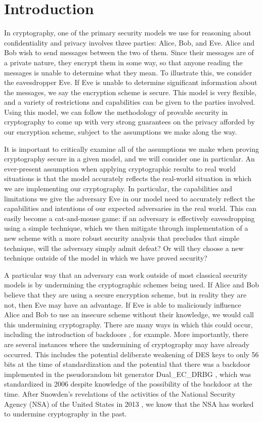 \chapter{Introduction}

In cryptography, one of the primary security models we use for reasoning about confidentiality and privacy involves three parties: Alice, Bob, and Eve. Alice and Bob wish to send messages between the two of them. Since their messages are of a private nature, they encrypt them in some way, so that anyone reading the messages is unable to determine what they mean. To illustrate this, we consider the eavesdropper Eve. If Eve is unable to determine significant information about the messages, we say the encryption scheme is secure. This model is very flexible, and a variety of restrictions and capabilities can be given to the parties involved. Using this model, we can follow the methodology of provable security in cryptography to come up with very strong guarantees on the privacy afforded by our encryption scheme, subject to the assumptions we make along the way.

It is important to critically examine all of the assumptions we make when proving cryptography secure in a given model, and we will consider one in particular. An ever-present assumption when applying cryptographic results to real world situations is that the model accurately reflects the real-world situation in which we are implementing our cryptography. In particular, the capabilities and limitations we give the adversary Eve in our model need to accurately reflect the capabilities and intentions of our expected adversaries in the real world. This can easily become a cat-and-mouse game: if an adversary is effectively eavesdropping using a simple technique, which we then mitigate through implementation of a new scheme with a more robust security analysis that precludes that simple technique, will the adversary simply admit defeat? Or will they choose a new technique outside of the model in which we have proved security?

A particular way that an adversary can work outside of most classical security models is by undermining the cryptographic schemes being used. If Alice and Bob believe that they are using a secure encryption scheme, but in reality they are not, then Eve may have an advantage. If Eve is able to maliciously influence Alice and Bob to use an insecure scheme without their knowledge, we would call this undermining cryptography. There are many ways in which this could occur, including the introduction of backdoors \cite{FSE:RijPre97,FSE:Paterson99}, for example. More importantly, there are several instances where the undermining of cryptography may have already occurred. This includes the potential deliberate weakening of DES keys to only 56 bits at the time of standardization \cite{SB1988} and the potential that there was a backdoor implemented in the pseudorandom bit generator Dual\_EC\_DRBG \cite{USENIX:CNEGLRBMSF14}, which was standardized in 2006 despite knowledge of the possibility of the backdoor at the time. After Snowden's revelations of the activities of the National Security Agency (NSA) of the United States in 2013 \cite{snowden}, we know that the NSA has worked to undermine cryptography in the past.

